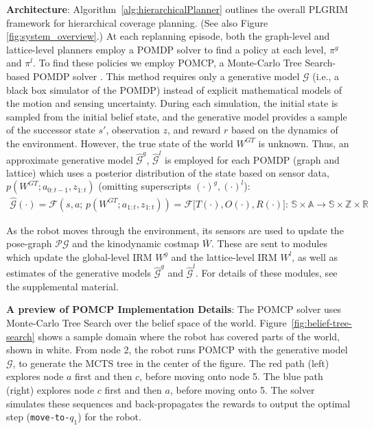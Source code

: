 \documentclass{article}
\newcommand{\ph}[1]{{\textbf{#1}:}} %
\begin{document}
\ph{Architecture} Algorithm~\ref{alg:hierarchicalPlanner} outlines the overall PLGRIM framework for hierarchical coverage planning.  (See also Figure \ref{fig:system_overview}.)
At each replanning episode, both the graph-level and lattice-level planners employ a POMDP solver to find a policy at each level, $\pi^g$ and $\pi^l$.  To find these policies we employ POMCP, a Monte-Carlo Tree Search-based POMDP solver \cite{silver2010monte}.  This method requires only a generative model $\mathcal{G}$  (i.e., a black box simulator of the POMDP) instead of explicit mathematical models of the motion and sensing uncertainty. During each simulation, the initial state is sampled from the initial belief state, and the generative model provides a sample of the successor state $s'$, observation $z$, and reward $r$ based on the dynamics of the environment. However, the true state of the world $W^{GT}$ is unknown.  Thus, an approximate generative model $\hat{\mathcal{G}}^g$, $\hat{\mathcal{G}}^l$ is employed for each POMDP (graph and lattice) which uses a posterior distribution of the state  based on sensor data, $p(W^{GT}; a_{0:t-1}, z_{1:t})$ (omitting superscripts $(\cdot)^g, (\cdot)^l$):
\begin{align}
    \hat{\mathcal{G}}(\cdot) = \mathcal{F}(s, a; \, p(W^{GT}; a_{1:t}, z_{1:t})) = \mathcal{F}\big[T(\cdot), O(\cdot), R(\cdot)\big]: \, \mathbb{S} \times \mathbb{A} \rightarrow \mathbb{S} \times \mathbb{Z} \times \mathbb{R}
\end{align}

As the robot moves through the environment, its sensors are used to update the pose-graph $\mathcal{PG}$ and the kinodynamic costmap $\bar{W}$.  These are sent to modules which update the global-level IRM $W^g$ and the lattice-level IRM $W^l$, as well as estimates of the generative models $\hat{\mathcal{G}}^g$ and $\hat{\mathcal{G}}^l$. For details of these modules, see the supplemental material.

\ph{A preview of POMCP Implementation Details}
The POMCP solver uses Monte-Carlo Tree Search over the belief space of the world. Figure~\ref{fig:belief-tree-search} shows a sample domain where the robot has covered parts of the world, shown in white. From node 2, the robot runs POMCP with the generative model $\mathcal{G}$, to generate the MCTS tree in the center of the figure. The red path (left) explores node $a$ first and then $c$, before moving onto node 5. The blue path (right) explores node $c$ first and then $a$, before moving onto 5. The solver simulates these sequences and back-propagates the rewards to output the optimal step (\texttt{move-to-$q_1$}) for the robot.
\end{document}
